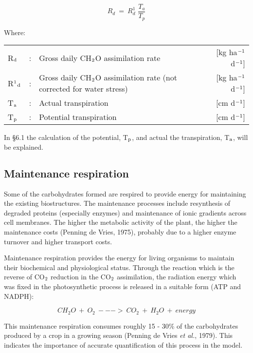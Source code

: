 \begin{equation}
R _{d} ~=~ R _{d}^{1} \,\,{\frac{T _{a} }{T _{p} }}
\end{equation}

Where:\\
\begin{tabularx}{\textwidth}{llXr}
R$_{{\rm d}}$ &:& Gross daily CH$_{{\rm 2}}$O assimilation rate   &     [kg ha$^{{\rm -1}}$ d$^{{\rm -1}}$]\\
R$^{{\rm 1}}$$_{{\rm d}}$ &:& Gross daily CH$_{{\rm 2}}$O assimilation rate
   (not corrected for water stress)   &     [kg ha$^{{\rm -1}}$ d$^{{\rm -1}}$]\\
T$_{{\rm a}}$ &:& Actual transpiration   &     [cm d$^{{\rm -1}}$]\\
T$_{{\rm p}}$ &:& Potential transpiration   &     [cm d$^{{\rm -1}}$]\\
\end{tabularx}

In \S 6.1 the calculation of the potential, T$_{{\rm p}}$, and actual the transpiration, T$_{{\rm a}}$, will be ex\-plained.

\subsection{Maintenance respiration}

Some of the carbohydrates formed are respired to provide energy for maintaining the
existing biostructures. The maintenance processes include resynthesis of degraded proteins
(especially enzymes) and maintenance of ionic gradients across cell mem\-branes. The
higher the metabolic activity of the plant, the higher the mainte\-nance costs (Penning de
Vries, 1975), probably due to a higher enzyme turnover and higher transport costs.

Maintenance respiration provides the energy for living organisms to maintain their
biochemical and physiological status. Through the reaction which is the reverse of CO$_{{\rm 2}}$
reduction in the CO$_{{\rm 2}}$ assimila\-tion, the radiation energy which was fixed in the
photosyn\-thetic process is released in a suitable form (ATP and NADPH):

\begin{equation}
CH _{2} O ~+~ O _{2} ~--->~ CO _{2} ~+~ H _{2} O ~+~ energy
\end{equation}

This maintenance respiration consumes roughly 15 - 30\% of the carbohy\-drates produced
by a crop in a growing season (Penning de Vries {\it et al.\/}, 1979). This indicates the
importance of accurate quantification of this process in the model.

